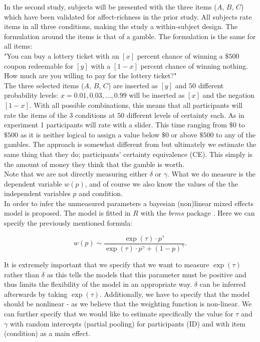 \documentclass[12pt]{article}
\begin{document}
\vspace{3mm}

In the second study, subjects will be presented
with the three items ($A$,  $B$,  $C$)
which have been validated
for affect-richness in the prior study. All
subjects rate items in all three conditions,
making the study a within-subject design.
The formulation
around the items is that of a gamble.
The formulation is the same
for all items: \\

"You can buy a lottery ticket with an $[x]$
percent chance of winning a $\$500$ coupon
redeemable for $[y]$ with a $[1-x]$ percent
chance of winning nothing. How much are you
willing to pay for the lottery ticket?" \\

The three selected items
($A$,  $B$,  $C$) are inserted as $[y]$
and $50$ different probability levels:
$x = 0.01, 0.03, \ldots, 0.99$ will be
inserted as $[x]$ and the negation $[1-x]$.
With all
possible combinations, this means that
all participants will rate the items of
the $3$ conditions
at $50$ different levels of certainty each.
As in experiment 1 participants will rate
with a slider. This time ranging from
$\$0$ to $\$500$ as it is neither logical
to assign a value below $\$0$ or above
$\$500$ to any of the gambles.
The approach is somewhat
different from \textcite{gonzalez1999shape}
but ultimately we estimate the same thing that
they do; participants' certainty equivalence (CE).
This simply is the amount of money they think
that the gamble is worth. \\

Note that we are not directly measuring either
$\delta$ or $\gamma$. What we do measure is the
dependent variable $w(p)$, and of course
we also know the values of the the independent
variables $p$ and condition. \\

In order to infer the
unmeasured parameters a bayesian (non)linear
mixed effects model is proposed. The model
is fitted in $R$ \autocite{rcore}
with the  $brms$ package \autocite{brms}.
Here we can specify the previously
mentioned formula:

 \[
	 w(p) \sim \frac{\exp({\tau})\cdot p^{\gamma}}
	 {\exp({\tau})\cdot p^{\gamma}+(1-p)^{\gamma}}
.\]

It is extremely important that we specify
that we want to measure $\exp(\tau)$ rather
than  $\delta$ as this tells the models that
this parameter must be positive and thus
limits the flexibility of the model in an
appropriate way.  $\delta$ can be inferred
afterwards by taking  $\exp(\tau)$.
Additionally, we have to specify that the model should
be nonlinear - as we believe that the weighting
function is non-linear.
We can further specify that we would like to
estimate specifically the value for $\tau$
and $\gamma$ with random intercepts (partial pooling)
for participants (ID) and with item (condition)
as a main
effect.
\end{document}
